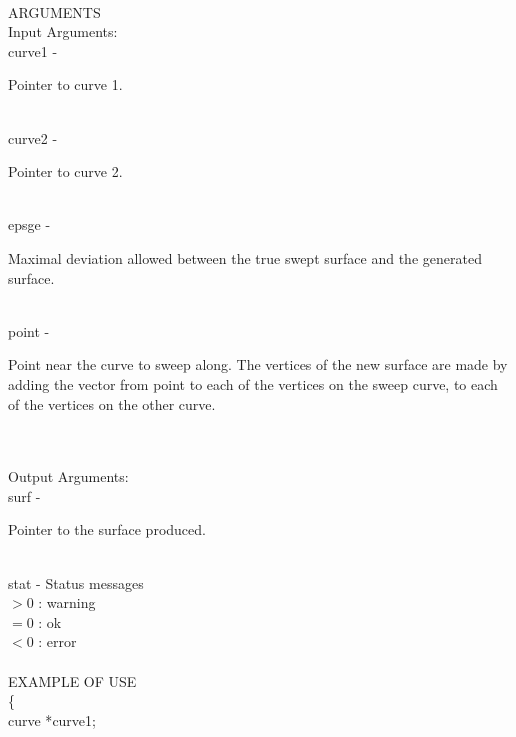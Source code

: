 \\
ARGUMENTS\\
        \>Input Arguments:\\
        \>\>    {\fov curve1}   \> - \> \begin{minipg2}
                                Pointer to curve 1.
                                \end{minipg2}\\
        \>\>    {\fov curve2}   \> - \> \begin{minipg2}
                                Pointer to curve 2.
                                \end{minipg2}\\
        \>\>    {\fov epsge}\> - \>     \begin{minipg2}
                                Maximal deviation allowed between the true swept
                                surface and the generated surface.
                                \end{minipg2}\\[0.3ex]
        \>\>    {\fov point}    \> - \> \begin{minipg2}
                Point near the curve to sweep along. The vertices of the new surface are made by adding the vector from point to each of the vertices on the sweep curve, to each of the vertices on the other curve.
                                \end{minipg2} \\[0.8ex]
\\
        \>Output Arguments:\\
        \>\>    {\fov surf}     \> - \> \begin{minipg2}
                                Pointer to the surface produced.
                                \end{minipg2}\\
        \>\>    {\fov stat}     \> - \> Status messages\\
                \>\>\>\>\>              $>0$    : warning\\
                \>\>\>\>\>              $=0$    : ok\\
                \>\>\>\>\>              $<0$    : error\\
\\
EXAMPLE OF USE\\
                \>      \{ \\
                \>\>    curve   \>      *{\fov curve1};\\
